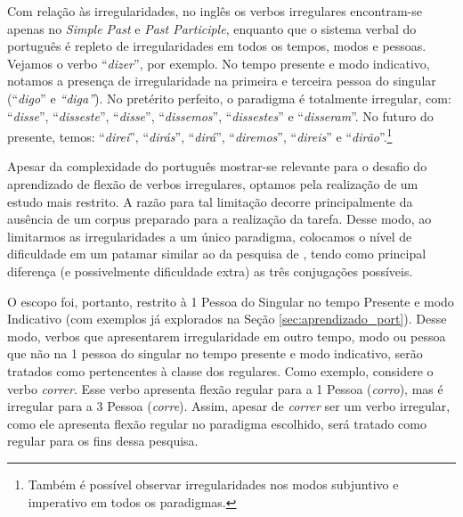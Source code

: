 Com relação às irregularidades, no inglês os verbos irregulares encontram-se apenas no \textit{Simple Past} e \textit{Past Participle}, enquanto que o sistema verbal do português é repleto de irregularidades em todos os tempos, modos e pessoas. Vejamos o verbo “\textit{dizer}”, por exemplo. No tempo presente e modo indicativo, notamos a presença de irregularidade na primeira e terceira pessoa do singular (“\textit{digo}” e \textit{“diga”}). No pretérito perfeito, o paradigma é totalmente irregular, com: “\textit{disse}”, “\textit{disseste}”, “\textit{disse}”, “\textit{dissemos}”, “\textit{dissestes}” e “\textit{disseram}”. No futuro do presente, temos: “\textit{direi}”, “\textit{dirás}”, “\textit{dirá}”, “\textit{diremos}”, “\textit{direis}” e “\textit{dirão}”.\footnote{Também é possível observar irregularidades nos modos subjuntivo e imperativo em todos os paradigmas.} 

Apesar da complexidade do português mostrar-se relevante para o desafio do aprendizado de flexão de verbos irregulares, optamos pela realização de um estudo mais restrito. A razão para tal limitação decorre principalmente da ausência de um corpus preparado para a realização da tarefa. Desse modo, ao limitarmos as irregularidades a um único paradigma, colocamos o nível de dificuldade em um patamar similar ao da pesquisa de \cite{rumelhart:1986}, tendo como principal diferença (e possivelmente dificuldade extra) as três conjugações possíveis. 

O escopo foi, portanto, restrito à 1 Pessoa do Singular no tempo Presente e modo Indicativo (com exemplos já explorados na Seção \ref{sec:aprendizado_port}). Desse modo, verbos que apresentarem irregularidade em outro tempo, modo ou pessoa que não na 1 pessoa do singular no tempo presente e modo indicativo, serão tratados como pertencentes à classe dos regulares. Como exemplo, considere o verbo \textit{correr}. Esse verbo apresenta flexão regular para a 1 Pessoa (\textit{corro}), mas é irregular para a 3 Pessoa (\textit{corre}). Assim, apesar de \textit{correr} ser um verbo irregular, como ele apresenta flexão regular no paradigma escolhido, será tratado como regular para os fins dessa pesquisa. 
